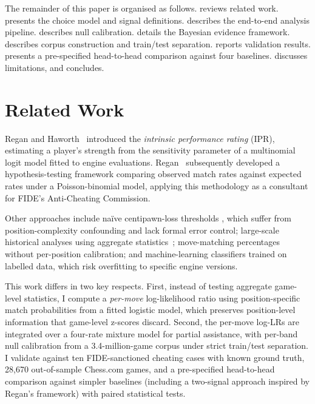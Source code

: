 \documentclass[11pt,a4paper]{article}
\theoremstyle{definition}
\begin{document}
The remainder of this paper is organised as follows.
 reviews related work.
 presents the choice model and signal definitions.
 describes the end-to-end analysis pipeline.
 describes null calibration.
 details the Bayesian evidence framework.
 describes corpus construction and train/test separation.
 reports validation results.
 presents a pre-specified head-to-head comparison
against four baselines.
 discusses limitations, and
 concludes.

\section{Related Work}
\label{sec:related}

Regan and Haworth~\citep{regan2011understanding} introduced the
\emph{intrinsic performance rating} (IPR), estimating a player's
strength from the sensitivity parameter of a multinomial logit model
fitted to engine evaluations.  Regan~\citep{regan2014cheating}
subsequently developed a hypothesis-testing framework comparing observed
match rates against expected rates under a Poisson-binomial model,
applying this methodology as a consultant for FIDE's Anti-Cheating
Commission.

Other approaches include na\"ive centipawn-loss thresholds
\citep{guid2006computer}, which suffer from position-complexity
confounding and lack formal error control;
large-scale historical analyses using aggregate
statistics~\citep{alliot2017who,ferreira2013using}; move-matching
percentages without per-position calibration; and machine-learning
classifiers trained on labelled data, which risk overfitting to
specific engine versions.

This work differs in two key respects.  First, instead of testing
aggregate game-level statistics, I compute a \emph{per-move}
log-likelihood ratio using position-specific match probabilities from a
fitted logistic model, which preserves position-level information that
game-level z-scores discard.  Second, the per-move log-LRs are
integrated over a four-rate mixture model for partial assistance, with
per-band null calibration from a 3.4-million-game corpus under strict
train/test separation.  I validate against ten FIDE-sanctioned cheating
cases with known ground truth, 28{,}670 out-of-sample Chess.com games,
and a pre-specified head-to-head comparison against simpler baselines
(including a two-signal approach inspired by Regan's framework) with
paired statistical tests.
\end{document}
